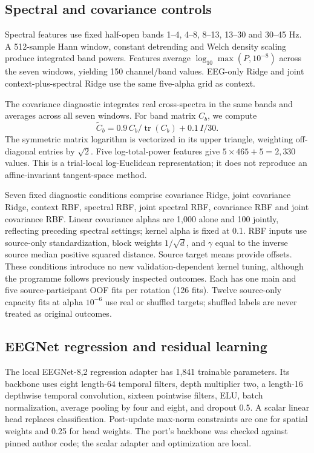 \documentclass[conference]{IEEEtran}
\begin{document}
\subsection{Spectral and covariance controls}
Spectral features use fixed half-open bands 1--4, 4--8, 8--13, 13--30 and 30--45 Hz. A 512-sample Hann window, constant detrending and Welch density scaling produce integrated band powers. Features average \(\log_{10}\max(P,10^{-8})\) across the seven windows, yielding 150 channel/band values. EEG-only Ridge and joint context-plus-spectral Ridge use the same five-alpha grid as context.

The covariance diagnostic integrates real cross-spectra in the same bands and averages across all seven windows. For band matrix \(C_b\), we compute
\begin{equation}
\widetilde C_b=0.9\,C_b/\operatorname{tr}(C_b)+0.1\,I/30.
\end{equation}
The symmetric matrix logarithm is vectorized in its upper triangle, weighting off-diagonal entries by \(\sqrt{2}\). Five log-total-power features give \(5\times465+5=2{,}330\) values. This is a trial-local log-Euclidean representation; it does not reproduce an affine-invariant tangent-space method.

Seven fixed diagnostic conditions comprise covariance Ridge, joint covariance Ridge, context RBF, spectral RBF, joint spectral RBF, covariance RBF and joint covariance RBF. Linear covariance alphas are 1,000 alone and 100 jointly, reflecting preceding spectral settings; kernel alpha is fixed at 0.1. RBF inputs use source-only standardization, block weights \(1/\sqrt{d}\), and \(\gamma\) equal to the inverse source median positive squared distance. Source target means provide offsets. These conditions introduce no new validation-dependent kernel tuning, although the programme follows previously inspected outcomes. Each has one main and five source-participant OOF fits per rotation (126 fits). Twelve source-only capacity fits at alpha \(10^{-6}\) use real or shuffled targets; shuffled labels are never treated as original outcomes.

\subsection{EEGNet regression and residual learning}
The local EEGNet-8,2 regression adapter has 1,841 trainable parameters. Its backbone uses eight length-64 temporal filters, depth multiplier two, a length-16 depthwise temporal convolution, sixteen pointwise filters, ELU, batch normalization, average pooling by four and eight, and dropout 0.5. A scalar linear head replaces classification. Post-update max-norm constraints are one for spatial weights and 0.25 for head weights. The port's backbone was checked against pinned author code; the scalar adapter and optimization are local.
\end{document}
